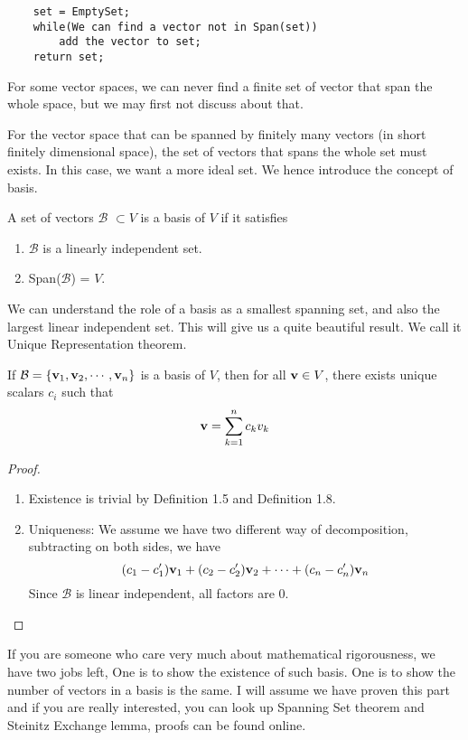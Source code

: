 \begin{verbatim}
    set = EmptySet;
    while(We can find a vector not in Span(set))
        add the vector to set;
    return set;
\end{verbatim}

\begin{note}
    For some vector spaces, we can never find a finite set of vector that span the whole space, but we may first not discuss about that.
\end{note}
For the vector space that can be spanned by finitely many vectors (in short finitely dimensional space), the set of vectors that spans the whole set must exists. In this case, we want a more ideal set. We hence introduce the concept of basis.

\begin{definition}
    A set of vectors $\mathcal{B}$ $\subset V$ is a basis of $V$ if it satisfies
    \begin{enumerate}
        \item $\mathcal{B}$ is a linearly independent set.
        \item Span($\mathcal{B}$) = $V$.
    \end{enumerate}
\end{definition}

We can understand the role of a basis as a smallest spanning set, and also the largest linear independent set. This will give us a quite beautiful result. We call it Unique Representation theorem.

\begin{theorem}
     If $\mathcal{B} = \{\mathbf{v}_1,\mathbf{v}_2,\cdots,\mathbf{v}_n\}$ is a basis of $V$, then for all $\mathbf{v} \in V$, there exists unique scalars $c_i$ such that $$\mathbf{v} = \sum_{k = 1}^n c_kv_k$$
\end{theorem}
\begin{proof}
    \begin{enumerate}
        \item Existence is trivial by Definition 1.5 and Definition 1.8.
        \item Uniqueness: We assume we have two different way of decomposition, subtracting on both sides, we have $$(c_1-c_1')\mathbf{v}_1+(c_2-c_2')\mathbf{v}_2+\cdots+(c_n-c_n')\mathbf{v}_n$$
        Since $\mathcal{B}$ is linear independent, all factors are $0$.
    \end{enumerate}
\end{proof}

If you are someone who care very much about mathematical rigorousness, we have two jobs left, One is to show the existence of such basis. One is to show the number of vectors in a basis is the same. I will assume we have proven this part and if you are really interested, you can look up Spanning Set theorem and Steinitz Exchange lemma, proofs can be found online.

